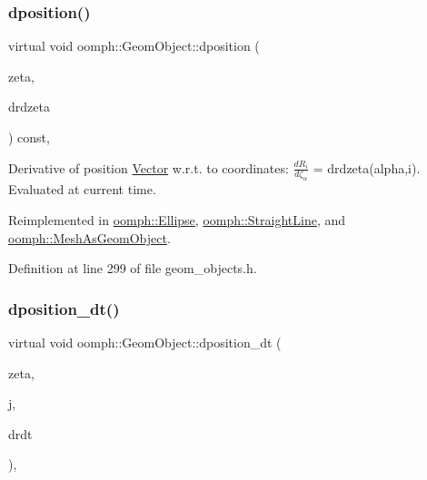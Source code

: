 \subsubsection{\texorpdfstring{dposition()}{dposition()}}
{\footnotesize\ttfamily virtual void oomph\+::\+Geom\+Object\+::dposition (\begin{DoxyParamCaption}\item[{const \hyperlink{classoomph_1_1Vector}{Vector}$<$ double $>$ \&}]{zeta,  }\item[{\hyperlink{classoomph_1_1DenseMatrix}{Dense\+Matrix}$<$ double $>$ \&}]{drdzeta }\end{DoxyParamCaption}) const\hspace{0.3cm}{\ttfamily [inline]}, {\ttfamily [virtual]}}



Derivative of position \hyperlink{classoomph_1_1Vector}{Vector} w.\+r.\+t. to coordinates\+: $ \frac{dR_i}{d \zeta_\alpha}$ = drdzeta(alpha,i). Evaluated at current time. 



Reimplemented in \hyperlink{classoomph_1_1Ellipse_af8caf51de734dff257fa3dbde14fa167}{oomph\+::\+Ellipse}, \hyperlink{classoomph_1_1StraightLine_a306df01816b5d015d18208c1a9ce1af1}{oomph\+::\+Straight\+Line}, and \hyperlink{classoomph_1_1MeshAsGeomObject_aed3e9376f6042fed597098c0017a2131}{oomph\+::\+Mesh\+As\+Geom\+Object}.



Definition at line 299 of file geom\+\_\+objects.\+h.

\mbox{\label{classoomph_1_1GeomObject_aa46469e491d25eda8dbe213f07152974}} 
\subsubsection{\texorpdfstring{dposition\+\_\+dt()}{dposition\_dt()}}
{\footnotesize\ttfamily virtual void oomph\+::\+Geom\+Object\+::dposition\+\_\+dt (\begin{DoxyParamCaption}\item[{const \hyperlink{classoomph_1_1Vector}{Vector}$<$ double $>$ \&}]{zeta,  }\item[{const unsigned \&}]{j,  }\item[{\hyperlink{classoomph_1_1Vector}{Vector}$<$ double $>$ \&}]{drdt }\end{DoxyParamCaption})\hspace{0.3cm}{\ttfamily [inline]}, {\ttfamily [virtual]}}



